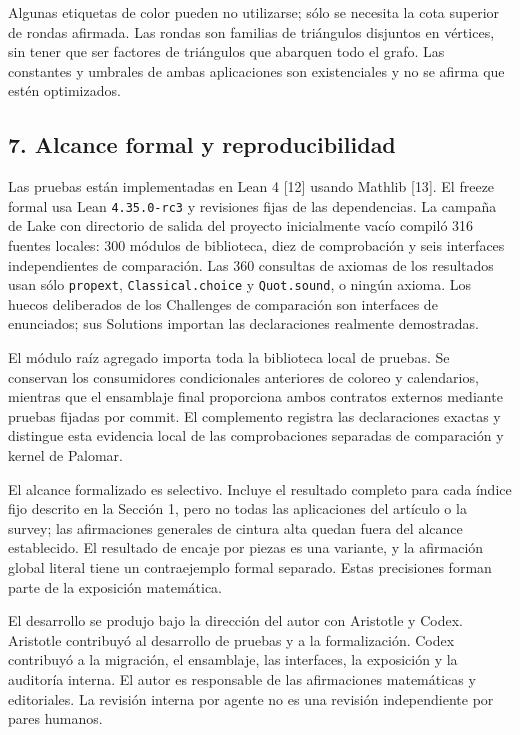 \documentclass[spanish,11pt,a4paper]{article}
\begin{document}
Algunas etiquetas de color pueden no utilizarse; sólo se necesita la cota superior de rondas afirmada. Las rondas son familias de triángulos disjuntos en vértices, sin tener que ser factores de triángulos que abarquen todo el grafo. Las constantes y umbrales de ambas aplicaciones son existenciales y no se afirma que estén optimizados.

\subsection{7. Alcance formal y reproducibilidad}\label{alcance-formal-y-reproducibilidad}

Las pruebas están implementadas en Lean 4 {[}12{]} usando Mathlib {[}13{]}. El freeze formal usa Lean \texttt{4.\allowbreak{}35.\allowbreak{}0-rc3} y revisiones fijas de las dependencias. La campaña de Lake con directorio de salida del proyecto inicialmente vacío compiló 316 fuentes locales: 300 módulos de biblioteca, diez de comprobación y seis interfaces independientes de comparación. Las 360 consultas de axiomas de los resultados usan sólo \texttt{propext}, \texttt{Classical.\allowbreak{}choice} y \texttt{Quot.\allowbreak{}sound}, o ningún axioma. Los huecos deliberados de los Challenges de comparación son interfaces de enunciados; sus Solutions importan las declaraciones realmente demostradas.

El módulo raíz agregado importa toda la biblioteca local de pruebas. Se conservan los consumidores condicionales anteriores de coloreo y calendarios, mientras que el ensamblaje final proporciona ambos contratos externos mediante pruebas fijadas por commit. El complemento registra las declaraciones exactas y distingue esta evidencia local de las comprobaciones separadas de comparación y kernel de Palomar.

El alcance formalizado es selectivo. Incluye el resultado completo para cada índice fijo descrito en la Sección 1, pero no todas las aplicaciones del artículo o la survey; las afirmaciones generales de cintura alta quedan fuera del alcance establecido. El resultado de encaje por piezas es una variante, y la afirmación global literal tiene un contraejemplo formal separado. Estas precisiones forman parte de la exposición matemática.

El desarrollo se produjo bajo la dirección del autor con Aristotle y Codex. Aristotle contribuyó al desarrollo de pruebas y a la formalización. Codex contribuyó a la migración, el ensamblaje, las interfaces, la exposición y la auditoría interna. El autor es responsable de las afirmaciones matemáticas y editoriales. La revisión interna por agente no es una revisión independiente por pares humanos.
\end{document}
